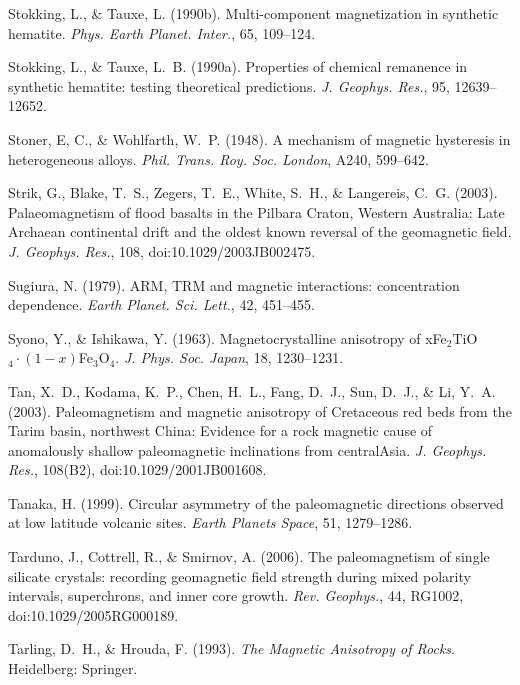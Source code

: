 \documentclass[,plain]{tauxe}
\begin{document}
\begin{thebibliography}{}
\bibitem{}%
Stokking, L., \& Tauxe, L. (1990b).
Multi-component magnetization in synthetic hematite.
{\it Phys. Earth Planet. Inter.}, 65, 109--124.

\bibitem{}%
Stokking, L., \& Tauxe, L.~B. (1990a).
Properties of chemical remanence in synthetic hematite: testing theoretical predictions.
{\it J. Geophys. Res.}, 95, 12639--12652.

\bibitem{}%
Stoner, E, C., \& Wohlfarth, W.~P. (1948).
A mechanism of magnetic hysteresis in heterogeneous alloys.
{\it Phil. Trans. Roy. Soc. London}, A240, 599--642.

\bibitem{}%
Strik, G., Blake, T.~S., Zegers, T.~E., White, S.~H., \& Langereis, C.~G. (2003).
Palaeomagnetism of flood basalts in the Pilbara Craton, Western Australia: Late Archaean continental drift and the oldest known reversal of the geomagnetic field.
{\it J. Geophys. Res.}, 108, doi:10.1029/2003JB002475.

\bibitem{}%
Sugiura, N. (1979).
{ARM}, {TRM} and magnetic interactions: concentration dependence.
{\it Earth Planet. Sci. Lett.}, 42, 451--455.

\bibitem{}%
Syono, Y., \& Ishikawa, Y. (1963).
Magnetocrystalline anisotropy of xFe$_2$TiO$_4\cdot(1-x)$Fe$_3$O$_4$.
{\it J. Phys. Soc. Japan}, 18, 1230--1231.

\bibitem{}%
Tan, X.~D., Kodama, K.~P., Chen, H.~L., Fang, D.~J., Sun, D.~J., \& Li, Y.~A. (2003).
Paleomagnetism and magnetic anisotropy of Cretaceous red beds from the Tarim basin, northwest China: Evidence for a rock magnetic cause of anomalously shallow paleomagnetic inclinations from central\break Asia.
{\it J. Geophys. Res.}, 108(B2), doi:10.1029/2001JB001608.

\bibitem{}%
Tanaka, H. (1999).
Circular asymmetry of the paleomagnetic directions observed at low latitude volcanic sites.
{\it Earth Planets Space}, 51, 1279--1286.

\bibitem{}%
Tarduno, J., Cottrell, R., \& Smirnov, A. (2006).
The paleomagnetism of single silicate crystals: recording geomagnetic field strength during mixed polarity intervals, superchrons, and inner core growth.
{\it Rev. Geophys.}, 44, RG1002, doi:10.1029/2005RG000189.

\bibitem{}%
Tarling, D.~H., \& Hrouda, F. (1993).
{\it The Magnetic Anisotropy of Rocks}.
Heidelberg: Springer.


\end{thebibliography}
\end{document}

